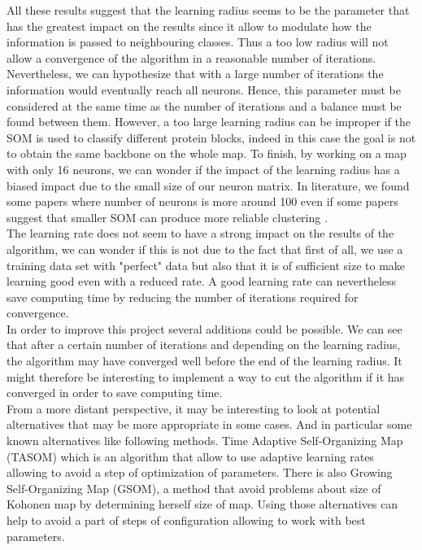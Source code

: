 \documentclass[11pt,a4paper]{article}
\begin{document}
    
    All these results suggest that the learning radius seems to be the parameter that has the greatest impact on the results since it allow to modulate how the information is passed to neighbouring classes. Thus a too low radius will not allow a convergence of the algorithm in a reasonable number of iterations. Nevertheless, we can hypothesize that with a large number of iterations the information would eventually reach all neurons. Hence, this parameter must be considered at the same time as the number of iterations and a balance must be found between them.  However, a too large learning radius can be improper if the SOM is used to classify different protein blocks, indeed in this case the goal is not to obtain the same backbone on the whole map. To finish, by working on a map with only 16 neurons, we can wonder if the impact of the learning radius has a biased impact due to the small size of our neuron matrix. In literature, we found some papers where number of neurons is more around 100 \cite{schuchhardt_schneider_reichelt_schomburg_wrede_1996} even if some papers suggest that smaller SOM can produce more reliable clustering \cite{bouvier_evrard-todeschi_girault_bertho_2009}.\\
    The learning rate does not seem to have a strong impact on the results of the algorithm, we can wonder if this is not due to the fact that first of all, we use a training data set with "perfect" data but also that it is of sufficient size to make learning good even with a reduced rate. A good learning rate can nevertheless save computing time by reducing the number of iterations required for convergence.\\

    In order to improve this project several additions could be possible. We can see that after a certain number of iterations and depending on the learning radius, the algorithm may have converged well before the end of the learning radius. It might therefore be interesting to implement a way to cut the algorithm if it has converged in order to save computing time.\\
    From a more distant perspective, it may be interesting to look at potential alternatives that may be more appropriate in some cases. And in particular some known alternatives like following methods. Time Adaptive Self-Organizing Map (TASOM) \cite{1187438} which is an algorithm that allow to use adaptive learning rates allowing to avoid a step of optimization of parameters. There is also Growing Self-Organizing Map (GSOM), a method that avoid problems about size of Kohonen map by determining herself size of map. Using those alternatives  can help to avoid a part of steps of configuration allowing to work with best parameters.\\
\end{document}
